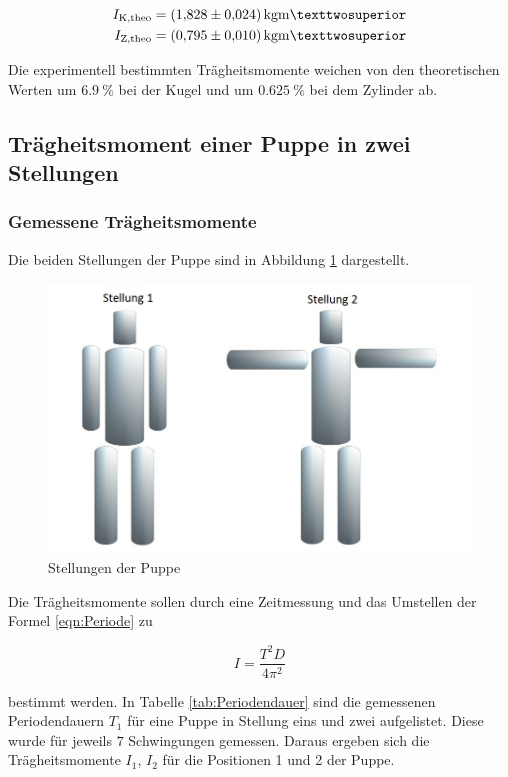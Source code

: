 \begin{align*}
I_\text{K,theo} &= \SI{1.828+-0.024}{\kilo\gram\meter²}\\
I_\text{Z,theo} &= \SI{0.795+-0.010}{\kilo\gram\meter²}
\end{align*}

Die experimentell bestimmten Trägheitsmomente weichen von den theoretischen
Werten um $\SI{6.9}{\percent}$ bei der Kugel und um $\SI{0.625}{\percent}$ bei dem Zylinder ab.

\subsection{Trägheitsmoment einer Puppe in zwei Stellungen}
\subsubsection{Gemessene Trägheitsmomente}

Die beiden Stellungen der Puppe sind in Abbildung \ref{fig:Stellungen} dargestellt.

\begin{figure}
  \centering
  \includegraphics[scale=0.2]{content/Puppe_Stellungen.jpg}
  \caption{Stellungen der Puppe}
  \label{fig:Stellungen}
\end{figure}

Die Trägheitsmomente sollen durch eine Zeitmessung und das Umstellen der Formel \eqref{eqn:Periode} zu

\begin{equation}
  I = \frac{T^2 D} {4 \pi^2}
\end{equation}

bestimmt werden. In Tabelle \ref{tab:Periodendauer} sind die gemessenen Periodendauern $T_1$ für eine Puppe
in Stellung eins und zwei aufgelistet. Diese wurde für jeweils $7$ Schwingungen gemessen.  
Daraus ergeben sich die Trägheitsmomente $I_1$, $I_2$ für die Positionen 1 und 2 der Puppe.

